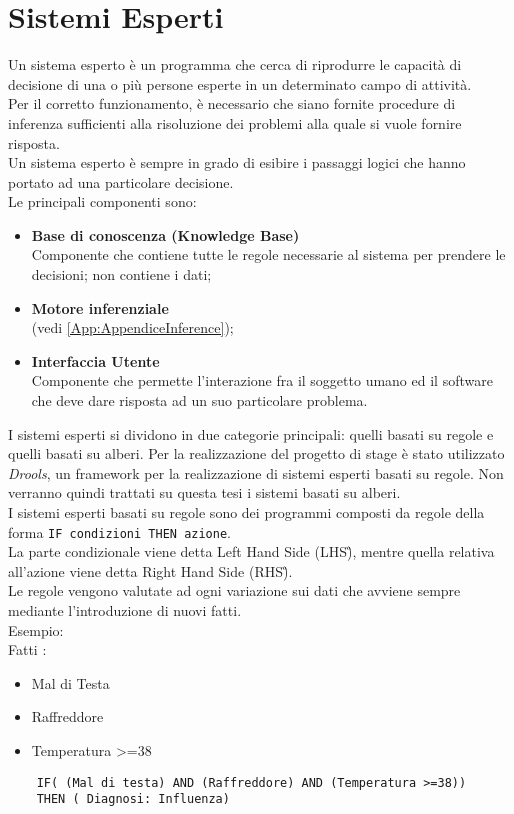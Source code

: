 \section{Sistemi Esperti}

 \label{App:AppendiceSistemiEsperti}
 
 Un sistema esperto è un programma che cerca di riprodurre le capacità di decisione di una o più persone esperte in un determinato campo di attività. \\
 Per il corretto funzionamento, è necessario che siano fornite procedure di inferenza sufficienti alla risoluzione dei problemi alla quale si vuole fornire risposta. \\
 Un sistema esperto è sempre in grado di esibire i passaggi logici che hanno portato ad una particolare decisione. \\
 Le principali componenti sono: 
 \begin{itemize}
 	\item \textbf{Base di conoscenza (Knowledge Base)}\\
	 	Componente che contiene tutte le regole necessarie al sistema per prendere le decisioni; non contiene i dati; 
	\item \textbf{Motore inferenziale} \\
	  (vedi \autoref{App:AppendiceInference});
	\item \textbf{Interfaccia Utente} \\
		Componente che permette l'interazione fra il soggetto umano ed il software che deve dare risposta ad un suo particolare problema.
 \end{itemize}
 
 
 I sistemi esperti si dividono in due categorie principali: quelli basati su regole e quelli basati su alberi. 
 Per la realizzazione del progetto di stage è stato utilizzato \textit{Drools}, un framework per la realizzazione di sistemi esperti basati su regole. Non verranno quindi trattati su questa tesi i sistemi basati su alberi.\\
 I sistemi esperti basati su regole sono dei programmi composti da regole della forma \texttt{IF condizioni THEN azione}.\\
  La parte condizionale viene detta Left Hand Side (\gls{LHS}\G), mentre quella relativa all'azione viene detta Right Hand Side (\gls{RHS}\G).\\
 Le regole vengono valutate ad ogni variazione sui dati che avviene sempre mediante l'introduzione di nuovi fatti.\\
 Esempio: \\
	 Fatti :
	 \begin{itemize}
	 	\item Mal di Testa
	 	\item Raffreddore
	 	\item Temperatura >=38
	 \end{itemize}
 \begin{lstlisting}
	IF( (Mal di testa) AND (Raffreddore) AND (Temperatura >=38))
	THEN ( Diagnosi: Influenza)
 \end{lstlisting}

 
 

